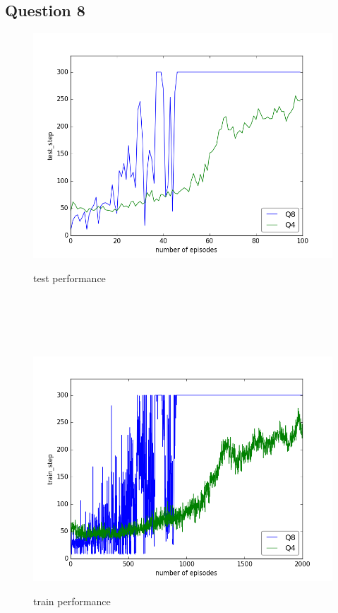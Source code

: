 \documentclass{report}
\begin{document}
\subsection*{Question 8}

\begin{figure}[H]
\begin{minipage}[c]{.49\linewidth}
	\centering
	\includegraphics[width = \linewidth]{plots/a8/test_step.png}
	\caption{test performance}
    \end{minipage}
    \hfill%
\begin{minipage}[c]{.49\linewidth}
    \centering 
    \includegraphics[width = \linewidth]{plots/a8/train_step.png}
	\caption{train performance}
\end{minipage}

\end{figure}
\end{document}
